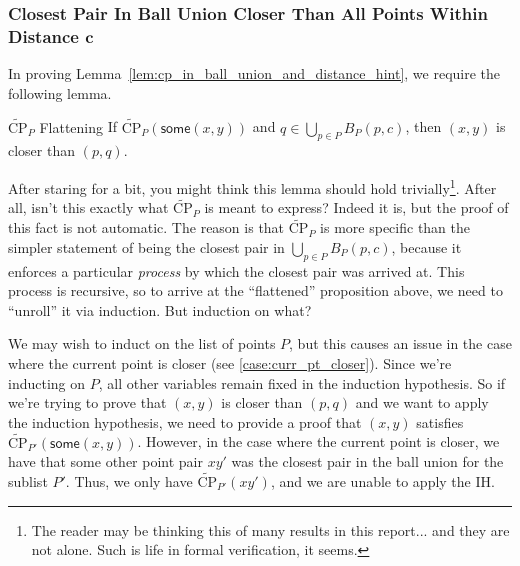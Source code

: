 \documentclass{article}
\begin{document}



\subsubsection{Closest Pair In Ball Union Closer Than All Points Within Distance $\mathbf{c}$}
\label{sec:cp_in_ball_union_high_level}
In proving Lemma~\ref{lem:cp_in_ball_union_and_distance_hint}, we require the following lemma.
\begin{tcblemma}{$\widetilde{\text{CP}}_P$ Flattening}{}
  If $\widetilde{\text{CP}}_P(\mathsf{some}(x, y))$ and $q \in \bigcup_{p \in P} B_P(p, c)$, then $(x, y)$ is closer than $(p, q)$.
\end{tcblemma}
After staring for a bit, you might think this lemma should hold trivially\footnote{
  The reader may be thinking this of many results in this report... and they are not alone.
  Such is life in formal verification, it seems.
}.
After all, isn't this exactly what $\widetilde{\text{CP}}_P$ is meant to express?
Indeed it is, but the proof of this fact is not automatic.
The reason is that $\widetilde{\text{CP}}_P$ is more specific than the simpler statement of being the closest pair in $\bigcup_{p \in P} B_P(p, c)$, because it enforces a particular \textit{process} by which the closest pair was arrived at.
This process is recursive, so to arrive at the ``flattened'' proposition above, we need to ``unroll'' it via induction.
But induction on what?

We may wish to induct on the list of points $P$, but this causes an issue in the case where the current point is closer (see \ref{case:curr_pt_closer}).
Since we're inducting on $P$, all other variables remain fixed in the induction hypothesis.
So if we're trying to prove that $(x,y)$ is closer than $(p,q)$ and we want to apply the induction hypothesis, we need to provide a proof that $(x, y)$ satisfies $\widetilde{\text{CP}}_{P'}(\mathsf{some}(x, y))$.
However, in the case where the current point is closer, we have that some other point pair $x\!y'$ was the closest pair in the ball union for the sublist $P'$.
Thus, we only have $\widetilde{\text{CP}}_{P'}(x\!y')$, and we are unable to apply the IH.
\end{document}
